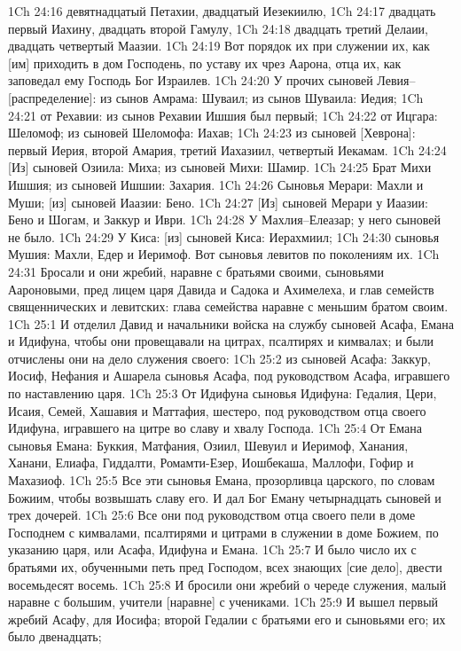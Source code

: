 1Ch 24:16  девятнадцатый Петахии, двадцатый Иезекиилю,
1Ch 24:17  двадцать первый Иахину, двадцать второй Гамулу,
1Ch 24:18  двадцать третий Делаии, двадцать четвертый Маазии.
1Ch 24:19  Вот порядок их при служении их, как [им] приходить в дом Господень, по уставу их чрез Аарона, отца их, как заповедал ему Господь Бог Израилев.
1Ch 24:20  У прочих сыновей Левия--[распределение]: из сынов Амрама: Шуваил; из сынов Шуваила: Иедия;
1Ch 24:21  от Рехавии: из сынов Рехавии Ишшия был первый;
1Ch 24:22  от Ицгара: Шеломоф; из сыновей Шеломофа: Иахав;
1Ch 24:23  из сыновей [Хеврона]: первый Иерия, второй Амария, третий Иахазиил, четвертый Иекамам.
1Ch 24:24  [Из] сыновей Озиила: Миха; из сыновей Михи: Шамир.
1Ch 24:25  Брат Михи Ишшия; из сыновей Ишшии: Захария.
1Ch 24:26  Сыновья Мерари: Махли и Муши; [из] сыновей Иаазии: Бено.
1Ch 24:27  [Из] сыновей Мерари у Иаазии: Бено и Шогам, и Заккур и Иври.
1Ch 24:28  У Махлия--Елеазар; у него сыновей не было.
1Ch 24:29  У Киса: [из] сыновей Киса: Иерахмиил;
1Ch 24:30  сыновья Мушия: Махли, Едер и Иеримоф. Вот сыновья левитов по поколениям их.
1Ch 24:31  Бросали и они жребий, наравне с братьями своими, сыновьями Аароновыми, пред лицем царя Давида и Садока и Ахимелеха, и глав семейств священнических и левитских: глава семейства наравне с меньшим братом своим.
1Ch 25:1  И отделил Давид и начальники войска на службу сыновей Асафа, Емана и Идифуна, чтобы они провещавали на цитрах, псалтирях и кимвалах; и были отчислены они на дело служения своего:
1Ch 25:2  из сыновей Асафа: Заккур, Иосиф, Нефания и Ашарела сыновья Асафа, под руководством Асафа, игравшего по наставлению царя.
1Ch 25:3  От Идифуна сыновья Идифуна: Гедалия, Цери, Исаия, Семей, Хашавия и Маттафия, шестеро, под руководством отца своего Идифуна, игравшего на цитре во славу и хвалу Господа.
1Ch 25:4  От Емана сыновья Емана: Буккия, Матфания, Озиил, Шевуил и Иеримоф, Ханания, Ханани, Елиафа, Гиддалти, Ромамти-Езер, Иошбекаша, Маллофи, Гофир и Махазиоф.
1Ch 25:5  Все эти сыновья Емана, прозорливца царского, по словам Божиим, чтобы возвышать славу его. И дал Бог Еману четырнадцать сыновей и трех дочерей.
1Ch 25:6  Все они под руководством отца своего пели в доме Господнем с кимвалами, псалтирями и цитрами в служении в доме Божием, по указанию царя, или Асафа, Идифуна и Емана.
1Ch 25:7  И было число их с братьями их, обученными петь пред Господом, всех знающих [сие дело], двести восемьдесят восемь.
1Ch 25:8  И бросили они жребий о череде служения, малый наравне с большим, учители [наравне] с учениками.
1Ch 25:9  И вышел первый жребий Асафу, для Иосифа; второй Гедалии с братьями его и сыновьями его; их было двенадцать;
